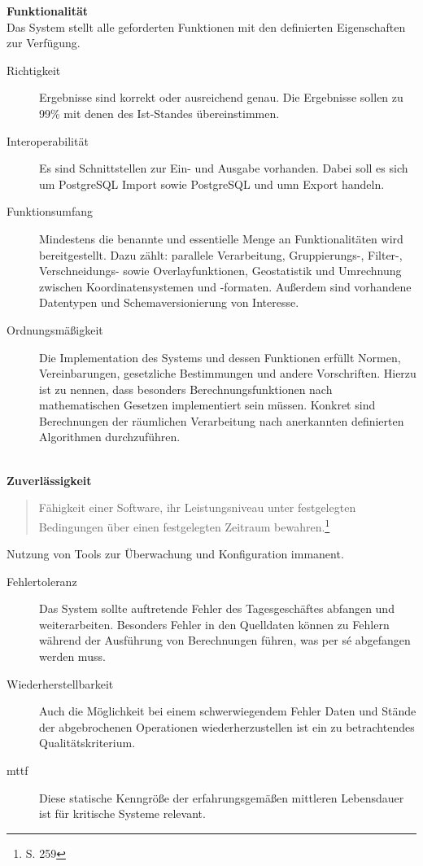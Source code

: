 \textbf{Funktionalität}\\
Das System stellt alle geforderten Funktionen mit den definierten Eigenschaften zur Verfügung.
\begin{description}
\item[Richtigkeit] Ergebnisse sind korrekt oder ausreichend genau. Die Ergebnisse sollen zu 99\% mit denen des Ist-Standes übereinstimmen.
\item[Interoperabilität] Es sind Schnittstellen zur Ein- und Ausgabe vorhanden. Dabei soll es sich um PostgreSQL Import sowie PostgreSQL und \Gls{umn} Export handeln.
\item[Funktionsumfang] Mindestens die benannte und essentielle Menge an Funktionalitäten wird bereitgestellt. Dazu zählt:
parallele Verarbeitung, Gruppierungs-, Filter-, Verschneidungs- sowie Overlayfunktionen, Geostatistik und Umrechnung zwischen Koordinatensystemen und -formaten. Außerdem sind vorhandene Datentypen und Schemaversionierung von Interesse.
\item[Ordnungsmäßigkeit] Die Implementation des Systems und dessen Funktionen erfüllt Normen, Vereinbarungen, gesetzliche Bestimmungen und andere Vorschriften. Hierzu ist zu nennen, dass besonders Berechnungsfunktionen nach mathematischen Gesetzen implementiert sein müssen. Konkret sind Berechnungen der räumlichen Verarbeitung nach anerkannten definierten Algorithmen durchzuführen.
\end{description}
\ \\
%
\textbf{Zuverlässigkeit}
\begin{quote}
Fähigkeit einer Software, ihr Leistungsniveau unter festgelegten Bedingungen über einen festgelegten Zeitraum bewahren.\footnote{\cite{book:lehrbuchsoftware} S. 259}
\end{quote}
Nutzung von Tools zur Überwachung und Konfiguration immanent.
\begin{description}
\item[Fehlertoleranz] Das System sollte auftretende Fehler des Tagesgeschäftes abfangen und weiterarbeiten. Besonders Fehler in den Quelldaten können zu Fehlern während der Ausführung von Berechnungen führen, was per s\'{e} abgefangen werden muss.
\item[Wiederherstellbarkeit] Auch die Möglichkeit bei einem schwerwiegendem Fehler Daten und Stände der abgebrochenen Operationen wiederherzustellen ist ein zu betrachtendes Qualitätskriterium.
\item[\Gls{mttf}] Diese statische Kenngröße der erfahrungsgemäßen mittleren Lebensdauer ist für kritische Systeme relevant.
\end{description}
